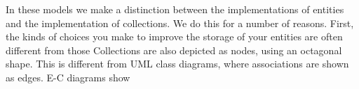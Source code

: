 In these models we make a distinction between the implementations of entities
and the implementation of collections.  We do this for a number of reasons. 
First, the kinds of choices you make to improve the storage of your entities are
often different from those Collections are also depicted as nodes, using an
octagonal shape.  This is different from UML class diagrams, where associations
are shown as edges. E-C diagrams show


\begin{comment}
\section{Conventions Used in This Book}

[NOTE(GSS): add data structure to the list.  possibly add relationship as well.]

Terms like object can have different meanings in the literature.  The following are the conventions used throughout this book.

\begin{itemize}
\item A \textit{class} is a Java class. A class name, for example \texttt{String}, always appears in type-writer font. 
\item A \textit{data model} is a set of classes that represents one or more logical concepts.
\item Finally, an \textit{object} is an instance of a class, that exists at runtime occupying a contiguous section of memory.
\end{itemize} 
\end{comment}





\begin{comment}
microscopic estimating (field-level counting), and accounting to predict
scale

EC diagram, bloat factory, scaling, 

lifetime: sometimes it's not a leak, just a consumption problem (in-memory
design, didn't fit)

sometimes optimizations cost: making a side object for rarely used fields; when
is it useful sharing immutable data (how much sharing before factoring it out
is worthwhile)

what java gives you, what it doesn't, some things are kinda hard to use; java
makes it hard for you

you actually have control



preface

things are hard to change at some point. it's easy to get to an irreconciliable
spot.

intro

why isn't this just for systems programmers making b-trees? this is about
everyday application development

i have GC, why care about lifetime?
i have standard data structures, why care about data model design?

data modeL: entites and relations

visual presentation of density
[flyweight: canonicalizing map]
\end{comment}